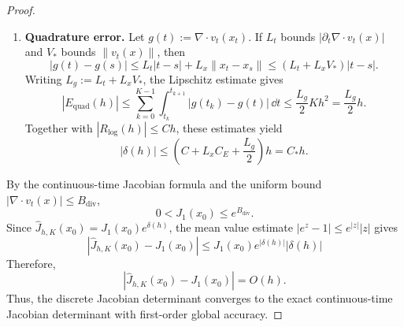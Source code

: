 \documentclass[12pt,a4paper,oneside]{book}
\begin{document}
\begin{proof}
\begin{enumerate}
    \item \textbf{Quadrature error.} Let $g(t):=\nabla\cdot v_t(x_t)$. If $L_t$ bounds $|\partial_t\nabla\cdot v_t(x)|$
        and $V_*$ bounds $\|v_t(x)\|$, then
        \begin{equation*}
            |g(t)-g(s)| \leq L_t|t-s| + L_x\|x_t-x_s\| \leq (L_t+L_xV_*)|t-s|.
        \end{equation*}
        Writing $L_g:=L_t+L_xV_*$, the Lipschitz estimate gives
        \begin{equation*}
            |E_{\mathrm{quad}}(h)| \leq \sum_{k=0}^{K-1} \int_{t_k}^{t_{k+1}} |g(t_k)-g(t)|\,\dd t \leq \frac{L_g}{2}Kh^2 = \frac{L_g}{2}h.
        \end{equation*}
        Together with $|R_{\log}(h)|\leq Ch$, these estimates yield
        \begin{equation*}
            |\delta(h)| \leq \left(C+L_xC_E+\frac{L_g}{2}\right)h = C_*h.
        \end{equation*}
\end{enumerate}

By the continuous-time Jacobian formula and the uniform bound $|\nabla\cdot v_t(x)|\leq B_{\mathrm{div}}$,
\begin{equation*}
    0<J_1(x_0)\leq e^{B_{\mathrm{div}}}.
\end{equation*}
Since $\widehat J_{h,K}(x_0)=J_1(x_0)e^{\delta(h)}$, the mean value estimate $|e^z-1|\leq e^{|z|}|z|$ gives
\begin{equation*}
    |\widehat J_{h,K}(x_0)-J_1(x_0)| \leq J_1(x_0)e^{|\delta(h)|}|\delta(h)|
\end{equation*}
Therefore,
\begin{equation*}
    |\widehat J_{h,K}(x_0)-J_1(x_0)|=O(h).
\end{equation*}
Thus, the discrete Jacobian determinant converges to the exact continuous-time Jacobian determinant with first-order global
accuracy.



\end{proof}
\end{document}
